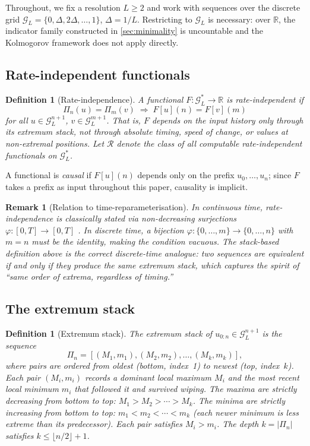 \documentclass[preprint,12pt]{elsarticle}
\newtheorem{definition}[theorem]{Definition}
\newtheorem{remark}[theorem]{Remark}
\newcommand{\R}{\mathcal{R}}
\newcommand{\Rr}{\mathbb{R}}
\newcommand{\stack}{\Pi}
\newcommand{\GL}{\mathcal{G}_L}
\begin{document}
Throughout, we fix a resolution $L \geq 2$ and work with sequences
over the discrete grid
$\GL = \{0, \Delta, 2\Delta, \ldots, 1\}$, $\Delta = 1/L$.
Restricting to $\GL$ is necessary: over $\Rr$, the indicator
family constructed in \cref{sec:minimality} is uncountable and
the Kolmogorov framework does not apply directly.

\subsection{Rate-independent functionals}

\begin{definition}[Rate-independence]
\label{def:ri}
A functional $F: \GL^{*} \to \Rr$ is \emph{rate-independent} if
\[
  \stack_n(u) = \stack_m(v)
  \;\Longrightarrow\;
  F[u](n) = F[v](m)
\]
for all $u \in \GL^{n+1}$, $v \in \GL^{m+1}$.
That is, $F$ depends on the input history only through its extremum
stack, not through absolute timing, speed of change, or values at
non-extremal positions.
Let $\R$ denote the class of all computable rate-independent
functionals on $\GL^*$.
\end{definition}

\noindent
A functional is \emph{causal} if $F[u](n)$ depends only on the
prefix $u_0,\ldots,u_n$; since $F$ takes a prefix as input
throughout this paper, causality is implicit.

\begin{remark}[Relation to time-reparameterisation]
\label{rem:reparam}
In continuous time, rate-independence is classically stated via
non-decreasing surjections $\varphi: [0,T] \to [0,T]$
\citep{Brokate1996}.
In discrete time, a bijection $\varphi:\{0,\ldots,m\}\to
\{0,\ldots,n\}$ with $m=n$ must be the identity, making
the condition vacuous.
The stack-based definition above is the correct discrete-time
analogue: two sequences are equivalent if and only if they produce
the same extremum stack, which captures the spirit of
``same order of extrema, regardless of timing.''
\end{remark}

\subsection{The extremum stack}

\begin{definition}[Extremum stack]
\label{def:stack}
The \emph{extremum stack} of $u_{0:n} \in \GL^{n+1}$ is the
sequence
\[
  \stack_n = [(M_1, m_1), (M_2, m_2), \ldots, (M_k, m_k)],
\]
where pairs are ordered from \emph{oldest} (bottom, index~1) to
\emph{newest} (top, index~$k$).
Each pair $(M_i, m_i)$ records a dominant local maximum $M_i$
and the most recent local minimum $m_i$ that followed it and
survived wiping.
The maxima are strictly decreasing from bottom to top:
$M_1 > M_2 > \cdots > M_k$.
The minima are strictly \emph{increasing} from bottom to top:
$m_1 < m_2 < \cdots < m_k$ (each newer minimum is less extreme
than its predecessor).
Each pair satisfies $M_i > m_i$.
The depth $k = |\stack_n|$ satisfies $k \leq \lfloor n/2 \rfloor + 1$.
\end{definition}
\end{document}
